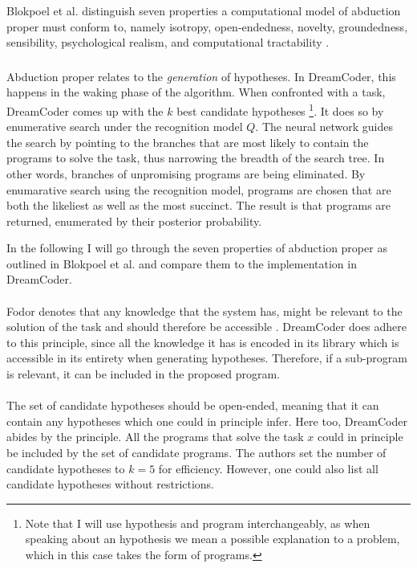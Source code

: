 Blokpoel et al. distinguish seven properties a computational model of abduction proper must conform to, namely isotropy, open-endedness, novelty, groundedness, sensibility, psychological realism, and computational tractability \cite{blokpoel2018deep}. 
\subsubsection{}

Abduction proper relates to the \textit{generation} of hypotheses. In DreamCoder, this happens in the waking phase of the algorithm. When confronted with a task, DreamCoder comes up with the $k$ best candidate hypotheses \footnote{Note that I will use hypothesis and program interchangeably, as when speaking about an hypothesis we mean a possible explanation to a problem, which in this case takes the form of programs.}. It does so by enumerative search under the recognition model $Q$. The neural network guides the search by pointing to the branches that are most likely to contain the programs to solve the task, thus narrowing the breadth of the search tree. In other words, branches of unpromising programs are being eliminated.
By enumarative search using the recognition model, programs are chosen that are both the likeliest as well as the most succinct. The result is that programs are returned, enumerated by their posterior probability.

In the following I will go through the seven properties of abduction proper as outlined in Blokpoel et al. \cite{blokpoel2018deep} and compare them to the implementation in DreamCoder.

\paragraph{} Fodor denotes that any knowledge that the system has, might be relevant to the solution of the task and should therefore be accessible \cite{fodor1983modularity}.
DreamCoder does adhere to this principle, since all the knowledge it has is encoded in its library which is accessible in its entirety when generating hypotheses. Therefore, if a sub-program is relevant, it can be included in the proposed program. 

\paragraph{} The set of candidate hypotheses should be open-ended, meaning that it can contain any hypotheses which one could in principle infer. Here too, DreamCoder abides by the principle. All the programs that solve the task $x$ could in principle be included by the set of candidate programs. The authors set the number of candidate hypotheses to $k = 5$ for efficiency. However, one could also list all candidate hypotheses without restrictions.


